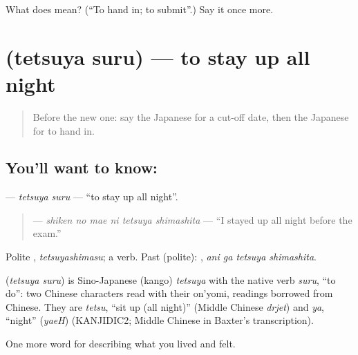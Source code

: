 \begin{tcolorbox}[breakable,colback=teal!4,colframe=teal!35!black,title={Before you move on}]
What does  mean? (\textquotedblleft{}To hand in; to submit\textquotedblright{}.) Say it once more.
\end{tcolorbox}
\section[\texorpdfstring{\ja{てつやする} (tetsuya suru)}{てつやする (tetsuya suru)}]{ (tetsuya suru) — to stay up all night}

\label{lesson:JA-C453-tetsuya-suru}



\begin{quote}
Before the new one: say the Japanese for a cut-off date, then the Japanese for to hand in.
\end{quote}

\subsection*{You'll want to know: }
\textbf{} — \emph{tetsuya suru} — \textquotedblleft{}to stay up all night\textquotedblright{}.

\begin{quote}
\textbf{  } — \emph{shiken no mae ni tetsuya shimashita} — \textquotedblleft{}I stayed up all night before the exam.\textquotedblright{}
\end{quote}

Polite \textbf{}, \emph{tetsuyashimasu}; a  verb. Past (polite): \textbf{ }, \emph{ani ga tetsuya shimashita}.

\begin{cousinweb}
\textbf{} (\emph{tetsuya suru}) is Sino-Japanese (kango) \emph{tetsuya} with the native verb \emph{suru}, \textquotedblleft{}to do\textquotedblright{}: two Chinese characters read with their on'yomi, readings borrowed from Chinese. They are \emph{tetsu}, \textquotedblleft{}sit up (all night)\textquotedblright{} (Middle Chinese \emph{drjet}) and \emph{ya}, \textquotedblleft{}night\textquotedblright{} (\emph{yaeH}) (KANJIDIC2; Middle Chinese in Baxter's transcription).
\end{cousinweb}

\begin{grammarlens}[title={What you've built}]
One more word for describing what you lived and felt.
\end{grammarlens}

